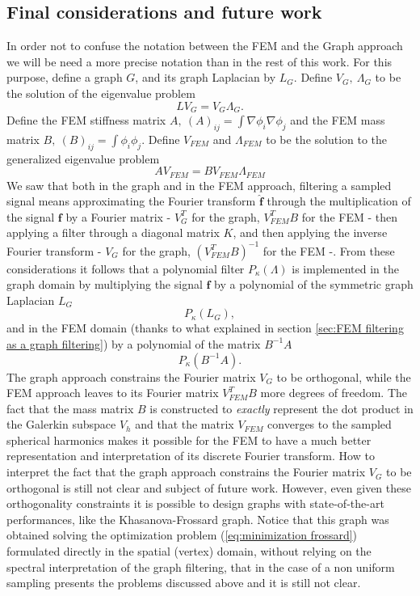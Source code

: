 \subsection{Final considerations and future work}
In order not to confuse the notation between the FEM and the Graph approach we will be need a more precise notation than in the rest of this work. For this purpose, define a graph $G$, and its graph Laplacian by $L_G$. Define $V_G,\ \Lambda_G$ to be the solution of the eigenvalue problem
$$
L V_G = V_G \Lambda_G.
$$
Define the FEM stiffness matrix $A,\ (A)_{ij} = \int\nabla\phi_i\nabla\phi_j$ and the FEM mass matrix $B,\ (B)_{ij} = \int\phi_i\phi_j$. Define $V_{FEM}$ and $\Lambda_{FEM}$ to be the solution to the generalized eigenvalue problem 
$$
AV_{FEM} = BV_{FEM}\Lambda_{FEM}
$$
We saw that both in the graph and in the FEM approach, filtering a sampled signal means approximating the Fourier transform $\hat{\mathbf f}$ through the multiplication of the signal $\mathbf f$ by a Fourier matrix - $V_G^T$ for the graph, $V_{FEM}^TB$ for the FEM - then applying a filter through a diagonal matrix $K$, and then applying the inverse Fourier transform - $V_G$ for the graph, $(V_{FEM}^TB)^{-1}$ for the FEM -. From these considerations it follows that a polynomial filter $P_\kappa(\Lambda)$ is implemented in the graph domain by multiplying the signal $\mathbf f$ by a polynomial of the symmetric graph Laplacian $L_G$
$$
P_\kappa(L_G),
$$
and in the FEM domain (thanks to what explained in section \ref{sec:FEM filtering as a graph filtering}) by a polynomial of the matrix $B^{-1}A$
$$P_\kappa(B^{-1}A).
$$
The graph approach constrains the Fourier matrix $V_G$ to be orthogonal, while the FEM approach leaves to its Fourier matrix $V_{FEM}^TB$ more degrees of freedom. The fact that the mass matrix $B$ is constructed to \textit{exactly} represent the dot product in the Galerkin subspace $V_h$ and that the matrix $V_{FEM}$ converges to the sampled spherical harmonics makes it possible for the FEM to have a much better representation and interpretation of its discrete Fourier transform. How to interpret the fact that the graph approach constrains the Fourier matrix $V_G$ to be orthogonal is still not clear and subject of future work. However, even given these orthogonality constraints it is possible to design graphs with state-of-the-art performances, like the Khasanova-Frossard graph. Notice that this graph was obtained solving the optimization problem (\ref{eq:minimization frossard}) formulated directly in the spatial (vertex) domain, without relying on the spectral interpretation of the graph filtering, that in the case of a non uniform sampling presents the problems discussed above and it is still not clear.

